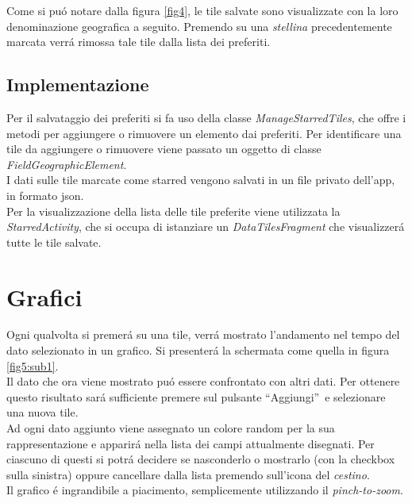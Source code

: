 \documentclass{article}
\newcommand{\quotes}[1]{``#1''}
\begin{document}
    Come si puó notare dalla figura \ref{fig4}, le tile salvate sono visualizzate con la loro denominazione geografica a seguito.
    Premendo su una \emph{stellina} precedentemente marcata verrá rimossa tale tile dalla lista dei preferiti.

    \subsection{Implementazione}
    Per il salvataggio dei preferiti si fa uso della classe \emph{ManageStarredTiles}, che offre i metodi per aggiungere o rimuovere un elemento dai preferiti. Per identificare una tile da aggiungere o rimuovere viene passato un oggetto di classe \emph{FieldGeographicElement}.
    \\
    I dati sulle tile marcate come starred vengono salvati in un file privato dell'app, in formato json.
    \\
    Per la visualizzazione della lista delle tile preferite viene utilizzata la \emph{StarredActivity}, che si occupa di istanziare un \emph{DataTilesFragment} che visualizzerá tutte le tile salvate.

    \section{Grafici}
    Ogni qualvolta si premerá su una tile, verrá mostrato l'andamento nel tempo del dato selezionato in un grafico.
    Si presenterá la schermata come quella in figura \ref{fig5:sub1}.
    \\
    Il dato che ora viene mostrato puó essere confrontato con altri dati. Per ottenere questo risultato sará sufficiente premere sul pulsante \quotes{Aggiungi} e selezionare una nuova tile.
    \\
    Ad ogni dato aggiunto viene assegnato un colore random per la sua rappresentazione e apparirá nella lista dei campi attualmente disegnati. 
    Per ciascuno di questi si potrá decidere se nasconderlo o mostrarlo (con la checkbox sulla sinistra) oppure cancellare dalla lista premendo sull'icona del \emph{cestino}.
    \\
    Il grafico é ingrandibile a piacimento, semplicemente utilizzando il \emph{pinch-to-zoom}.
\end{document}
